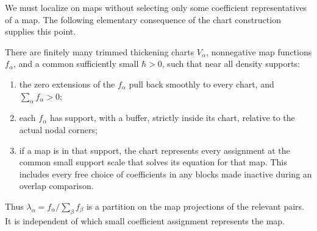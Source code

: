We must localize on maps without selecting only some coefficient
representatives of a map.  The following elementary consequence of the
chart construction supplies this point.

\begin{lemma}\label{virt:buffered-partitions}
There are finitely many trimmed thickening charts $V_\alpha$, nonnegative
map functions $f_\alpha$, and a common sufficiently small $\hbar>0$,
such that near all density supports:
\begin{enumerate}[label=\textup{(\roman*)}]
\item the zero extensions of the $f_\alpha$ pull back smoothly to every
chart, and $\sum_\alpha f_\alpha>0$;
\item each $f_\alpha$ has support, with a buffer, strictly inside its
chart, relative to the actual nodal corners;
\item if a map is in that support, the chart represents every assignment
at the common small support scale that solves its equation for that map.
This includes every free choice of coefficients in any blocks made
inactive during an overlap comparison.
\end{enumerate}
Thus $\lambda_\alpha=f_\alpha/\sum_\beta f_\beta$ is a partition on
the map projections of the relevant pairs.  It is independent of which
small coefficient assignment represents the map.
\end{lemma}

